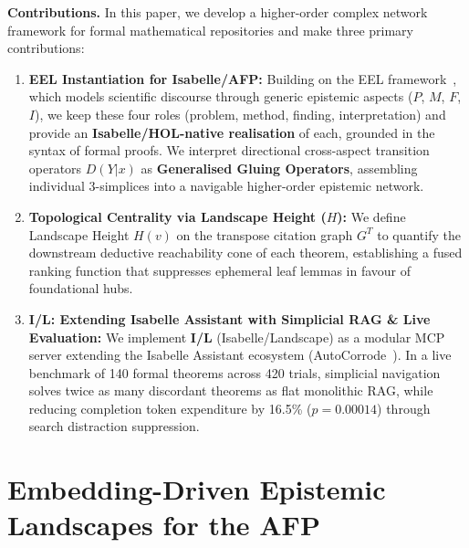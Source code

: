 \documentclass{svproc}
\begin{document}
\medskip\noindent\textbf{Contributions.} In this paper, we develop a higher-order complex network framework for formal mathematical repositories and make three primary contributions:
\begin{enumerate}
    \item \textbf{EEL Instantiation for Isabelle/AFP:} Building on the EEL framework~\cite{correia_eel_inprep,correia_embedding-based_2026}, which models scientific discourse through generic epistemic aspects ($P$, $M$, $F$, $I$), we keep these four roles (problem, method, finding, interpretation) and provide an \textbf{Isabelle/\allowbreak HOL-native realisation} of each, grounded in the syntax of formal proofs. We interpret directional cross-aspect transition operators $D(Y|x)$ as \textbf{Generalised Gluing Operators}, assembling individual 3-simplices into a navigable higher-order epistemic network.
    \item \textbf{Topological Centrality via Landscape Height ($H$):} We define Landscape Height $H(v)$ on the transpose citation graph $G^T$ to quantify the downstream deductive reachability cone of each theorem, establishing a fused ranking function that suppresses ephemeral leaf lemmas in favour of foundational hubs.
    \item \textbf{I/L: Extending Isabelle Assistant with Simplicial RAG \& Live Evaluation:} We implement \textbf{I/L} (Isabelle/Landscape) as a modular MCP server extending the Isabelle Assistant ecosystem (AutoCorrode~\cite{AutoCorrode}). In a live benchmark of 140 formal theorems across 420 trials, simplicial navigation solves twice as many discordant theorems as flat monolithic RAG, while reducing completion token expenditure by 16.5\% ($p = 0.00014$) through search distraction suppression.
\end{enumerate}

\section{Embedding-Driven Epistemic Landscapes for the AFP}\label{sec:eel_afp}
\end{document}
